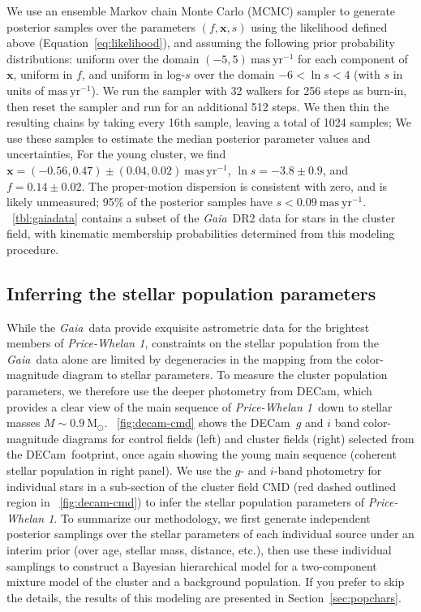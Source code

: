 \documentclass[twocolumn]{aastex62}
\newcommand{\acronym}[1]{{\small{#1}}}
\newcommand{\gaia}{\textsl{Gaia}}
\newcommand{\decam}{DECam}
\newcommand{\DR}[1]{\acronym{DR#1}}
\newcommand{\bs}[1]{\boldsymbol{#1}}
\newcommand{\sectionname}{Section}
\newcommand{\equationname}{Equation}
\newcommand{\msun}{\textrm{M}_\odot}
\newcommand{\masyr}{\ensuremath{\textrm{mas}~\textrm{yr}^{-1}}}
\newcommand{\clustername}{\textsl{Price-Whelan 1}}
\begin{document}
We use an ensemble Markov chain Monte Carlo (MCMC) sampler \citep[\texttt{emcee};][]{emcee, Goodman:2010} to generate posterior samples over the parameters $(f, \bs{x}, s)$ using the likelihood defined above (\equationname~\ref{eq:likelihood}), and assuming the following prior probability distributions: uniform over the domain $(-5, 5)~\masyr$ for each component of $\bs{x}$, uniform in $f$, and uniform in log-$s$ over the domain $-6 < \ln s < 4$ (with $s$ in units of \masyr).
We run the sampler with 32 walkers for 256 steps as burn-in, then reset the sampler and run for an additional 512 steps.
We then thin the resulting chains by taking every 16th sample, leaving a total of 1024 samples; We use these samples to estimate the median posterior parameter values and uncertainties,
For the young cluster, we find $\bs{x} = (-0.56,  0.47) \pm (0.04, 0.02)~\masyr$, $\ln s = -3.8 \pm 0.9$, and $f = 0.14 \pm 0.02$.
The proper-motion dispersion is consistent with zero, and is likely unmeasured; 95\% of the posterior samples have $s < 0.09~\masyr$.
\tablename~\ref{tbl:gaiadata} contains a subset of the \gaia\ \DR{2} data for stars in the cluster field, with kinematic membership probabilities determined from this modeling procedure.


\subsection{Inferring the stellar population parameters}
\label{sec:popmodel}

While the \gaia\ data provide exquisite astrometric data for the brightest members of \clustername, constraints on the stellar population from the \gaia\ data alone are limited by degeneracies in the mapping from the color-magnitude diagram to stellar parameters.
To measure the cluster population parameters, we therefore use the deeper photometry from \decam, which provides a clear view of the main sequence of \clustername\ down to stellar masses $M \sim 0.9~\msun$.
\figurename~\ref{fig:decam-cmd} shows the \decam\ $g$ and $i$ band color-magnitude diagrams for control fields (left) and cluster fields (right) selected from the \decam\ footprint, once again showing the young main sequence (coherent stellar population in right panel).
We use the $g$- and $i$-band photometry for individual stars in a sub-section of the cluster field CMD (red dashed outlined region in \figurename~\ref{fig:decam-cmd}) to infer the stellar population parameters of \clustername.
To summarize our methodology, we first generate independent posterior samplings over the stellar parameters of each individual source under an interim prior (over age, stellar mass, distance, etc.), then use these individual samplings to construct a Bayesian hierarchical model for a two-component mixture model of the cluster and a background population.
If you prefer to skip the details, the results of this modeling are presented in \sectionname~\ref{sec:popchars}.
\end{document}
